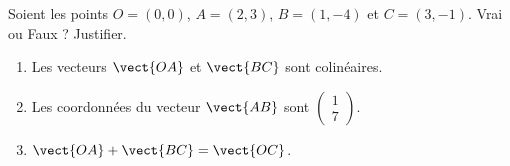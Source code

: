 
\begin{exercice}\label{exosmath-0331}

    Soient les points \( O=(0,0)\), \( A=(2,3)\), \( B=(1,-4)\) et \( C=(3,-1)\). Vrai ou Faux ? Justifier.
    \begin{enumerate}
        \item
            Les vecteurs \( \vect{ OA }\) et \( \vect{ BC }\) sont colinéaires.
        \item
            Les coordonnées du vecteur \( \vect{ AB }\) sont \( \begin{pmatrix}
                1    \\ 
                7    
            \end{pmatrix}\).
        \item
            \( \vect{ OA }+\vect{ BC }=\vect{ OC }\).
    \end{enumerate}

\end{exercice}
